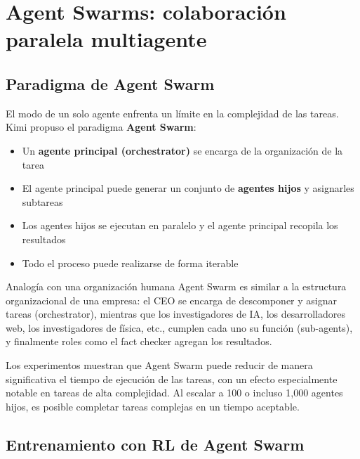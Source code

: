 \documentclass[a4paper]{article}
\begin{document}
\section{Agent Swarms: colaboración paralela multiagente}

\subsection{Paradigma de Agent Swarm}

El modo de un solo agente enfrenta un límite en la complejidad de las tareas. Kimi propuso el paradigma \textbf{Agent Swarm}:

\begin{itemize}
    \item Un \textbf{agente principal (orchestrator)} se encarga de la organización de la tarea
    \item El agente principal puede generar un conjunto de \textbf{agentes hijos} y asignarles subtareas
    \item Los agentes hijos se ejecutan en paralelo y el agente principal recopila los resultados
    \item Todo el proceso puede realizarse de forma iterable
\end{itemize}

\begin{knowledgebox}{Analogía con una organización humana}
Agent Swarm es similar a la estructura organizacional de una empresa: el CEO se encarga de descomponer y asignar tareas (orchestrator), mientras que los investigadores de IA, los desarrolladores web, los investigadores de física, etc., cumplen cada uno su función (sub-agents), y finalmente roles como el fact checker agregan los resultados.
\end{knowledgebox}

Los experimentos muestran que Agent Swarm puede reducir de manera significativa el tiempo de ejecución de las tareas, con un efecto especialmente notable en tareas de alta complejidad. Al escalar a 100 o incluso 1,000 agentes hijos, es posible completar tareas complejas en un tiempo aceptable.

\subsection{Entrenamiento con RL de Agent Swarm}
\end{document}
